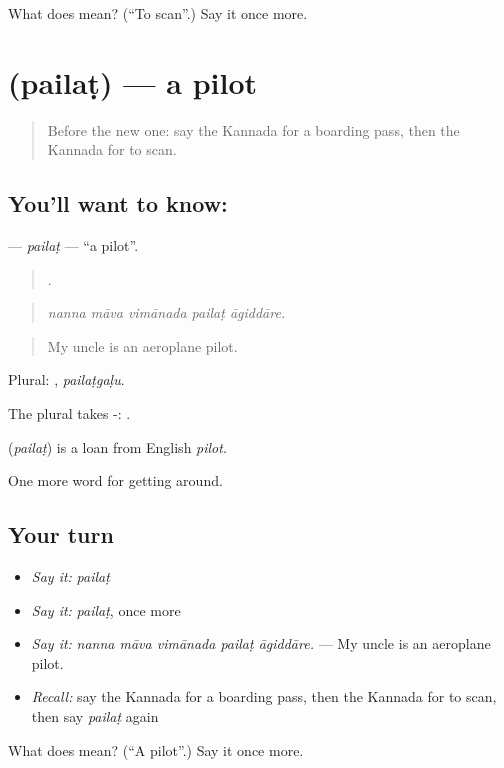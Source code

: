 \begin{tcolorbox}[breakable,colback=teal!4,colframe=teal!35!black,title={Before you move on}]
What does   mean? (\textquotedblleft{}To scan\textquotedblright{}.) Say it once more.
\end{tcolorbox}
\section[\texorpdfstring{\kn{ಪೈಲಟ್} (pailaṭ)}{ಪೈಲಟ್ (pailaṭ)}]{ (pailaṭ) — a pilot}

\label{lesson:KA-C437-pailat}



\begin{quote}
Before the new one: say the Kannada for a boarding pass, then the Kannada for to scan.
\end{quote}

\subsection*{You'll want to know: }
\textbf{} — \emph{pailaṭ} — \textquotedblleft{}a pilot\textquotedblright{}.

\begin{quote}
    .
\end{quote}

\begin{quote}
\emph{nanna māva vimānada pailaṭ āgiddāre.}
\end{quote}

\begin{quote}
My uncle is an aeroplane pilot.
\end{quote}

Plural: , \emph{pailaṭgaḷu}.

The plural takes -: .

\begin{cousinweb}
\textbf{} (\emph{pailaṭ}) is a loan from English \emph{pilot}.
\end{cousinweb}

\begin{grammarlens}[title={What you've built}]
One more word for getting around.
\end{grammarlens}

\subsection*{Your turn}
\begin{itemize}
\raggedright
  \item \emph{Say it:} \emph{pailaṭ}
  \item \emph{Say it:} \emph{pailaṭ}, once more
  \item \emph{Say it:} \emph{nanna māva vimānada pailaṭ āgiddāre.} — My uncle is an aeroplane pilot.
  \item \emph{Recall:} say the Kannada for a boarding pass, then the Kannada for to scan, then say \emph{pailaṭ} again
\end{itemize}

\begin{tcolorbox}[breakable,colback=teal!4,colframe=teal!35!black,title={Before you move on}]
What does  mean? (\textquotedblleft{}A pilot\textquotedblright{}.) Say it once more.
\end{tcolorbox}
